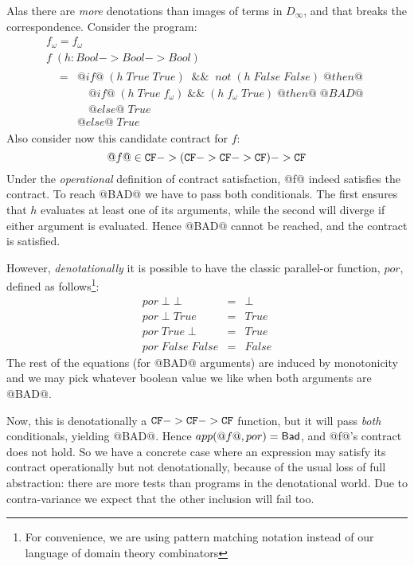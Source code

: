 Alas there are {\em more} denotations than images of terms in $D_{\infty}$,
and that breaks the correspondence. Consider the program:
\[\begin{array}{lcl}
f_\omega = f_\omega \\
f \; (h{:}Bool->Bool->Bool) \\ 
\begin{array}{lll}
  & =   & @if@\;(h\;True\;True)\;\;\&\& \;\;not\;(h\;False\;False)\;@then@ \\
  &     & \quad @if@\;(h\;True\;f_\omega)\;\&\&\;(h\;f_\omega\;True)\;@then@\;@BAD@ \\
  &     & \quad @else@\;True \\
  &     & @else@\;True
\end{array}
\end{array}\]
Also consider now this candidate contract for $f$:
\[ @f@ \in {\tt CF} -> ({\tt CF} -> {\tt CF} -> {\tt CF}) -> {\tt CF} \]
Under the \emph{operational} definition of contract satisfaction, 
@f@ indeed satisfies the contract.
To reach @BAD@ we have to pass both conditionals.
The first ensures that $h$ evaluates at least one of its
arguments, while the second will diverge if either argument is evaluated.
Hence @BAD@ cannot be reached, and the contract is satisfied. 

However, \emph{denotationally} it is possible to have the classic 
parallel-or function, $por$, defined as 
follows\footnote{For convenience, 
we are using pattern matching notation instead of our 
language of domain theory combinators}:
\[\begin{array}{lcl}
  por\;\bot\;\bot & = & \bot \\ 
  por\;\bot\;True & = & True \\
  por\;True\;\bot & = & True \\ 
  por\;False\;False & = & False
\end{array}\] 
The rest of the equations (for @BAD@ arguments) are induced by
monotonicity and we may pick whatever boolean value we like when both
arguments are @BAD@.

Now, this is denotationally a ${\tt CF} -> {\tt CF} -> {\tt CF}$ function, but it
will pass \emph{both} conditionals, 
yielding @BAD@. Hence $app(@f@,por) = \mathsf{Bad}$, and @f@'s contract does not hold.
So we have a concrete case where an expression may satisfy its
contract operationally but not denotationally, because of the usual
loss of full abstraction: there are more tests than programs in the denotational world. 
Due to contra-variance
we expect that the other inclusion will fail too. 

